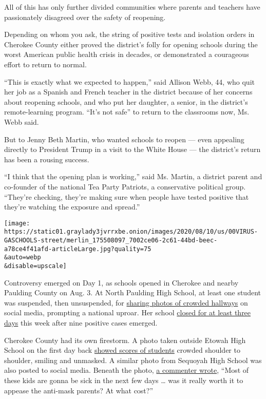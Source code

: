All of this has only further divided communities where parents and
teachers have passionately disagreed over the safety of reopening.

Depending on whom you ask, the string of positive tests and isolation
orders in Cherokee County either proved the district's folly for opening
schools during the worst American public health crisis in decades, or
demonstrated a courageous effort to return to normal.

``This is exactly what we expected to happen,'' said Allison Webb, 44,
who quit her job as a Spanish and French teacher in the district because
of her concerns about reopening schools, and who put her daughter, a
senior, in the district's remote-learning program. ``It's not safe'' to
return to the classrooms now, Ms. Webb said.

But to Jenny Beth Martin, who wanted schools to reopen --- even
appealing directly to President Trump in a visit to the White House ---
the district's return has been a rousing success.

``I think that the opening plan is working,'' said Ms. Martin, a
district parent and co-founder of the national Tea Party Patriots, a
conservative political group. ``They're checking, they're making sure
when people have tested positive that they're watching the exposure and
spread.''

\texttt{[image: https://static01.graylady3jvrrxbe.onion/images/2020/08/10/us/00VIRUS-GASCHOOLS-street/merlin\_175508097\_7002ce06-2c61-44bd-beec-a78ce4f41afd-articleLarge.jpg?quality=75\\\&auto=webp\\\&disable=upscale]}

Controversy emerged on Day 1, as schools opened in Cherokee and nearby
Paulding County on Aug. 3. At North Paulding High School, at least one
student was suspended, then unsuspended, for
\href{https://www.nytimes3xbfgragh.onion/2020/08/06/us/north-paulding-high-school-coronavirus-georgia.html}{sharing
photos of crowded hallways} on social media, prompting a national
uproar. Her school
\href{https://www.nytimes3xbfgragh.onion/2020/08/09/world/coronavirus-covid-19.html\#link-4c96afe0}{closed
for at least three days} this week after nine positive cases emerged.

Cherokee County had its own firestorm. A photo taken outside Etowah High
School on the first day back
\href{https://twitter.com/GAFollowers/status/1290437298685968385}{showed
scores of students} crowded shoulder to shoulder, smiling and unmasked.
A similar photo from Sequoyah High School was also posted to social
media. Beneath the photo,
\href{https://twitter.com/iyanilenicetv/status/1290428424482414594}{a
commenter wrote}, ``Most of these kids are gonna be sick in the next few
days \ldots{} was it really worth it to appease the anti-mask parents?
At what cost?''

